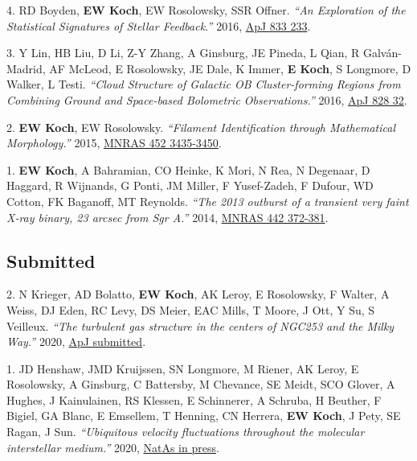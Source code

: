 \documentclass[letterpaper,11pt]{article}
\newenvironment{publist}{
  \begingroup
  \raggedright
  \begin{description}[leftmargin=4ex,style=sameline]
}{
  \end{description}
  \endgroup
}
\begin{document}
\begin{publist}
\item[4.] RD Boyden, \textbf{EW Koch}, EW Rosolowsky, SSR Offner. \textit{``An Exploration of the Statistical Signatures of Stellar Feedback.''} 2016, \href{http://adsabs.harvard.edu/abs/2016ApJ...833..233B}{ApJ 833 233}.
\item[3.] Y Lin, HB Liu, D Li, Z-Y Zhang, A Ginsburg, JE Pineda, L Qian, R Galv\'{a}n-Madrid, AF McLeod, E Rosolowsky, JE Dale, K Immer, \textbf{E Koch}, S Longmore, D Walker, L Testi. \textit{``Cloud Structure of Galactic OB Cluster-forming Regions from Combining Ground and Space-based Bolometric Observations.''} 2016, \href{http://adsabs.harvard.edu/abs/2016ApJ...828...32L}{ApJ 828 32}.
\item[2.] \textbf{EW Koch}, EW Rosolowsky. \textit{``Filament Identification through Mathematical Morphology.''} 2015, \href{http://adsabs.harvard.edu/abs/2015MNRAS.452.3435K}{MNRAS 452 3435-3450}.
\item[1.] \textbf{EW Koch}, A Bahramian, CO Heinke, K Mori, N Rea, N Degenaar, D Haggard, R Wijnands, G Ponti, JM Miller, F Yusef-Zadeh, F Dufour, WD Cotton, FK Baganoff, MT Reynolds. \textit{``The 2013 outburst of a transient very faint X-ray binary, 23 arcsec from Sgr A\textasteriskcentered.''} 2014, \href{http://adsabs.harvard.edu/abs/2014MNRAS.442..372K}{MNRAS 442 372-381}.
\end{publist}

\subsection*{Submitted}

\begin{publist}
\item[2.] N Krieger, AD Bolatto, \textbf{EW Koch}, AK Leroy, E Rosolowsky, F Walter, A Weiss, DJ Eden, RC Levy, DS Meier, EAC Mills, T Moore, J Ott, Y Su, S Veilleux. \textit{``The turbulent gas structure in the centers of NGC253 and the Milky Way.''} 2020, \href{http://adsabs.harvard.edu/abs/None}{ApJ submitted}.
\item[1.] JD Henshaw, JMD Kruijssen, SN Longmore, M Riener, AK Leroy, E Rosolowsky, A Ginsburg, C Battersby, M Chevance, SE Meidt, SCO Glover, A Hughes, J Kainulainen, RS Klessen, E Schinnerer, A Schruba, H Beuther, F Bigiel, GA Blanc, E Emsellem, T Henning, CN Herrera, \textbf{EW Koch}, J Pety, SE Ragan, J Sun. \textit{``Ubiquitous velocity fluctuations throughout the molecular interstellar medium.''} 2020, \href{http://adsabs.harvard.edu/abs/None}{NatAs in press}.
\end{publist}
\end{document}
